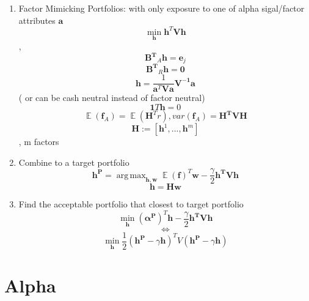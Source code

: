 \documentclass[11pt, openany]{book}              %
\DeclareMathOperator*{\argmax}{arg\,max}  %
\DeclareMathOperator{\E}{\mathbb{E}}
\begin{document}
\begin{enumerate}	
	\item Factor Mimicking Portfolios: with only exposure to one of alpha sigal/factor attributes $\mathbf{a}$
	$$ \min_{\mathbf{h}}  \mathbf{h}^T  \mathbf{V}  \mathbf{h}$$, 
	$$ \mathbf{B^T}_A \mathbf{h} = \mathbf{e}_j$$
	$$ \mathbf{B^T}_R \mathbf{h} = \mathbf{0}$$
	$$ \mathbf{h} = \frac{1}{ \mathbf{a}^T \mathbf{V} \mathbf{a}} \mathbf{{V}^{-1}a}$$
	( or can be cash neutral instead of factor neutral)
	$$ \mathbf{1}T\mathbf{h} = 0$$
	$$ \E(\mathbf{f}_A) = \E (\mathbf H^T r), var(\mathbf{f}_A) = \mathbf{H^TVH}$$
	$$ \mathbf{H} := [\mathbf{h}^1, ..., \mathbf{h}^m]$$, m factors
	\item Combine to a target portfolio
	$$ \mathbf{h^P} = \argmax_{\mathbf{h,w}} \E(\mathbf{f})^T \mathbf{w} - \frac{\gamma}{2} \mathbf{h^TVh}$$
	$$ \mathbf{h} = \mathbf{Hw}$$
	\item Find the acceptable portfolio that closest to target portfolio
	$$ \min_{\mathbf{h}} (\boldsymbol{\alpha^P})^T \mathbf{h} -  \frac{\gamma}{2} \mathbf{h^TVh}$$
	$$ \Leftrightarrow $$
	$$ \min_{\mathbf{h}} \frac{1}{2} (\mathbf{h^P} - \gamma \mathbf{h})^T V (\mathbf{h^P} - \gamma \mathbf{h})$$
	
	
\end{enumerate}

\section{Alpha}
\end{document}
